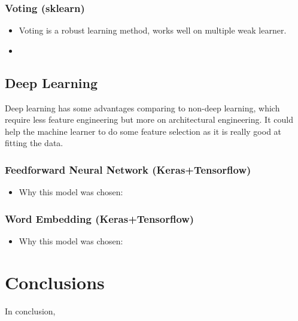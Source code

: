 \documentclass[11pt]{article}
\begin{document}
\subsubsection{Voting (sklearn)}
\begin{itemize}
      \item Voting is a robust learning method, works well on multiple weak learner.
      \item 
\end{itemize}

\subsection{Deep Learning}
Deep learning has some advantages comparing to non-deep learning, which require less
feature engineering but more on architectural engineering. It could help the machine 
learner to do some feature selection as it is really good at fitting the data.

\subsubsection{Feedforward Neural Network (Keras+Tensorflow)}
\begin{itemize}
      \item Why this model was chosen:
\end{itemize}

\subsubsection{Word Embedding (Keras+Tensorflow)}
\begin{itemize}
      \item Why this model was chosen:
\end{itemize}


\section{Conclusions}

In conclusion,



\end{document}
